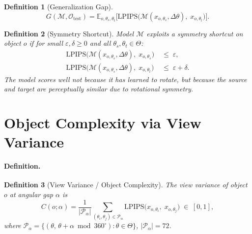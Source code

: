 \documentclass[11pt]{article}
\newtheorem{definition}{Definition}
\newcommand{\E}{\mathbb{E}}
\newcommand{\cP}{\mathcal{P}}
\newcommand{\cO}{\mathcal{O}}
\newcommand{\Dtheta}{\Delta\theta}
\newcommand{\lpips}{\mathrm{LPIPS}}
\begin{document}
\begin{definition}[Generalization Gap]
  \label{def:gen_gap}
  \begin{equation}
    G(\mathcal{M}, \cO_{\mathrm{test}}) =
    \E_{o,\theta_s,\theta_t}\bigl[
      \lpips\bigl(\mathcal{M}(x_{o,\theta_s}, \Dtheta),\; x_{o,\theta_t}\bigr)
    \bigr].
    \label{eq:gen_gap}
  \end{equation}
\end{definition}

\begin{definition}[Symmetry Shortcut]
  \label{def:shortcut}
  Model $\mathcal{M}$ \emph{exploits a symmetry shortcut} on object $o$ if for
  small $\varepsilon, \delta \geq 0$ and all $\theta_s, \theta_t \in \Theta$:
  \begin{align}
    \lpips\bigl(\mathcal{M}(x_{o,\theta_s}, \Dtheta),\; x_{o,\theta_s}\bigr)
    &\;\leq\; \varepsilon, \label{eq:shortcut1}\\
    \lpips\bigl(\mathcal{M}(x_{o,\theta_s}, \Dtheta),\; x_{o,\theta_t}\bigr)
    &\;\leq\; \varepsilon + \delta. \label{eq:shortcut2}
  \end{align}
  The model scores well not because it has learned to rotate, but because the
  source and target are perceptually similar due to rotational symmetry.
\end{definition}

\section{Object Complexity via View Variance}
\label{sec:complexity}

\paragraph{Definition.}

\begin{definition}[View Variance / Object Complexity]
  \label{def:complexity}
  The \emph{view variance} of object $o$ at angular gap $\alpha$ is
  \begin{equation}
    C(o;\alpha) = \frac{1}{|\cP_\alpha|}\sum_{(\theta_i,\theta_j)\in\cP_\alpha}
    \lpips\bigl(x_{o,\theta_i},\; x_{o,\theta_j}\bigr)
    \;\in\; [0,1],
    \label{eq:complexity}
  \end{equation}
  where $\cP_\alpha = \{(\theta,\, \theta{+}\alpha \bmod 360^{\circ}) :
  \theta \in \Theta\}$, $|\cP_\alpha| = 72$.
\end{definition}
\end{document}
